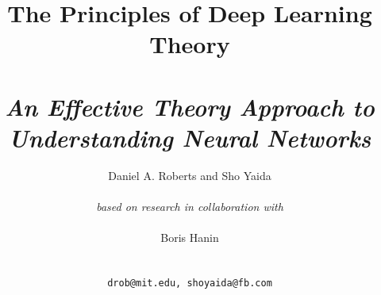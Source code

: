 
\title{\textbf{The Principles of Deep Learning Theory} \\~\\ \large{\emph{An Effective Theory Approach to Understanding Neural Networks}}}


\author{Daniel A. Roberts
and Sho Yaida
 \\~\\ \normalsize{\emph{based on research in collaboration with}} \\~\\ Boris Hanin  \\~\\~\\
\texttt{drob@mit.edu, shoyaida@fb.com}
}

\date{}





\maketitle